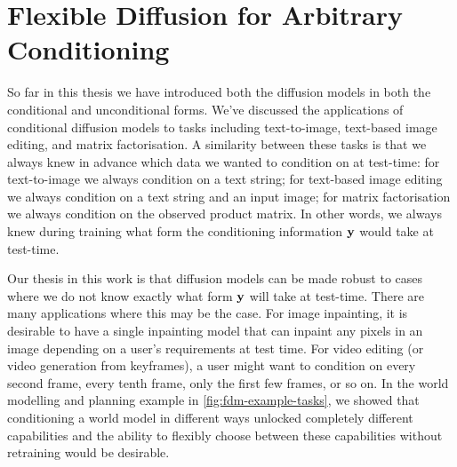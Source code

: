 \chapter{Flexible Diffusion for Arbitrary Conditioning}
\label{ch:flexible-diffusion}



So far in this thesis we have introduced both the diffusion models in both the conditional and unconditional forms. We've discussed the applications of conditional diffusion models to tasks including text-to-image, text-based image editing, and matrix factorisation. A similarity between these tasks is that we always knew in advance which data we wanted to condition on at test-time: for text-to-image we always condition on a text string; for text-based image editing we always condition on a text string and an input image; for matrix factorisation we always condition on the observed product matrix. In other words, we always knew during training what form the conditioning information ${\mathbf{y}}$ would take at test-time.

Our thesis in this work is that diffusion models can be made robust to cases where we do not know exactly what form ${\mathbf{y}}$ will take at test-time. There are many applications where this may be the case. For image inpainting, it is desirable to have a single inpainting model that can inpaint any pixels in an image depending on a user's requirements at test time. For video editing (or video generation from keyframes), a user might want to condition on every second frame, every tenth frame, only the first few frames, or so on. In the world modelling and planning example in \cref{fig:fdm-example-tasks}, we showed that conditioning a world model in different ways unlocked completely different capabilities and the ability to flexibly choose between these capabilities without retraining would be desirable.

